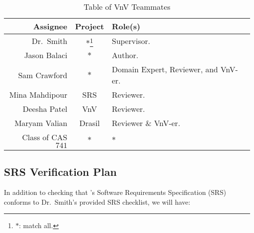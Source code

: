 \documentclass[12pt, titlepage]{article}
\begin{document}
\begin{longtable}{|r|c|l|}
    \caption{Table of VnV Teammates}
    \label{table:vnv_teammates}

    \\ \hline
    \rowcolor{Maroon}
    \textbf{Assignee}    & \textbf{Project}                  & \textbf{Role(s)}                                              \\ \hline
    \rowcolor{White}
    Dr.\ Smith           & \(*\)\footnote{\(*\): match all.} & Supervisor.                                                   \\ \hline
    Jason Balaci         & \(*\)                             & Author.                                                       \\ \hline
    Sam Crawford         & \(*\)                             & Domain Expert, Reviewer, and VnV-er.                          \\ \hline
    Mina Mahdipour       & SRS                               & Reviewer.                                                     \\ \hline
    Deesha Patel         & VnV                               & Reviewer.                                                     \\ \hline
    Maryam Valian        & Drasil                            & Reviewer \& VnV-er.                                           \\ \hline
    Class of CAS \(741\) & \(*\)                             & \(*\)                                                         \\ \hline
\end{longtable}

\subsection{SRS Verification Plan}

In addition to checking that \progname{}'s Software Requirements Specification
(SRS) conforms to Dr.\ Smith's provided SRS checklist, we will have:
\end{document}

